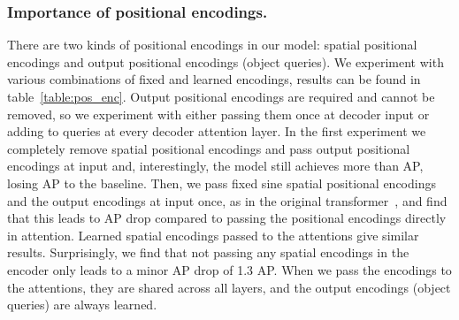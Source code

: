 \subsubsection{Importance of positional encodings.}
There are two kinds of positional encodings in our model: spatial 
positional encodings and output positional encodings (object queries).
We experiment with various combinations of fixed and learned encodings,
results can be found in table~\ref{table:pos_enc}.
Output positional encodings are required and cannot be removed,
so we experiment with either passing them once at decoder input
or adding to queries at every decoder attention layer.
In the first experiment we completely remove spatial positional encodings
and pass output positional encodings at input
and, interestingly, the model still achieves 
more than  AP, losing  AP to the baseline.
Then, we pass fixed sine spatial positional encodings and the output encodings
at input once, as in the original transformer~\cite{Vaswani2017AttentionIA},
and find that this leads to  AP drop compared to passing the positional encodings
directly in attention.
Learned spatial encodings passed to the attentions give
similar results.
Surprisingly, we find that not passing any spatial encodings in the encoder
only leads to a minor AP drop of 1.3 AP.
When we pass the encodings to the attentions, they are shared across all layers,
and the output encodings (object queries) are always learned.
\setlength{\tabcolsep}{6pt}
